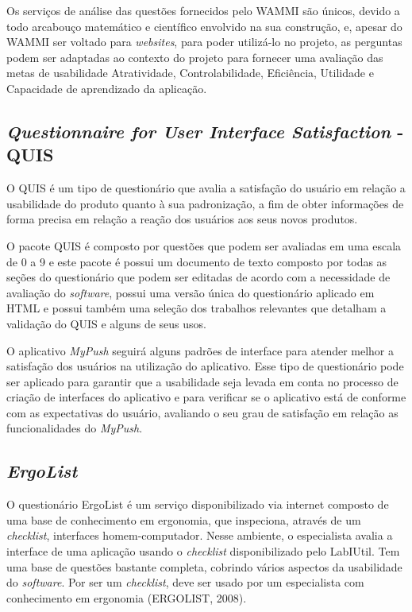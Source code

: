       Os serviços de análise das questões fornecidos pelo WAMMI são únicos, devido a todo arcabouço matemático e científico
      envolvido na sua construção, e, apesar do WAMMI ser voltado para \textit{websites}, para poder utilizá-lo no projeto, as perguntas
      podem ser adaptadas ao contexto do projeto para fornecer uma avaliação das metas de usabilidade Atratividade,
      Controlabilidade, Eficiência, Utilidade e Capacidade de aprendizado da aplicação.
    
    \subsection{\textit{Questionnaire for User Interface Satisfaction} - QUIS}
    
      O QUIS é um tipo de questionário que avalia a satisfação do usuário em relação a usabilidade do produto quanto à sua
      padronização, a fim de obter informações de forma precisa em relação a reação dos usuários aos seus novos produtos. 
      
      O pacote QUIS é composto por questões que podem ser avaliadas em uma escala de 0 a 9 e este pacote é possui um documento
      de texto composto por todas as seções do questionário que podem ser editadas de acordo com a necessidade de avaliação do 
      \textit{software}, possui uma versão única do questionário aplicado em HTML e possui também uma seleção dos trabalhos relevantes
      que detalham a validação do QUIS e alguns de seus usos. 
      
      O aplicativo \textit{MyPush} seguirá alguns padrões de interface para atender melhor a satisfação dos usuários na utilização do
      aplicativo. Esse tipo de questionário pode ser aplicado para garantir que a usabilidade seja levada em conta no processo de
      criação de interfaces do aplicativo e para verificar se o aplicativo está de conforme com as expectativas do usuário, 
      avaliando o seu grau de satisfação em relação as funcionalidades do \textit{MyPush}.
      
    \subsection{\textit{ErgoList}}
    
      O questionário ErgoList é um serviço disponibilizado via internet composto de uma base de conhecimento em ergonomia,
      que inspeciona, através de um \textit{checklist}, interfaces homem-computador. Nesse ambiente, o especialista avalia a interface 
      de uma aplicação usando o \textit{checklist} disponibilizado pelo LabIUtil. Tem uma base de questões bastante completa, cobrindo
      vários aspectos da usabilidade do \textit{software}. Por ser um \textit{checklist}, deve ser usado por um especialista com conhecimento em
      ergonomia (ERGOLIST, 2008).
      
